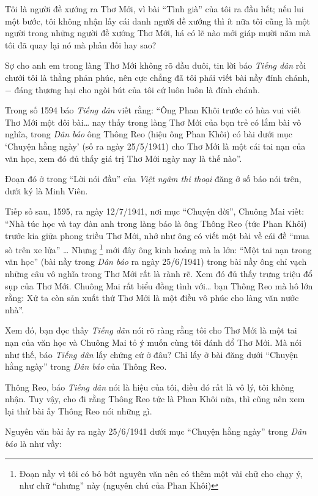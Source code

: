 \documentclass[../main.tex]{subfiles}
\begin{document}
\begin{multicols}{2}
Tôi là người đề xướng ra Thơ Mới, vì bài “Tình già” của tôi ra đầu hết; nếu lui một bước, tôi không nhận lấy cái danh người đề xướng thì ít nữa tôi cũng là một người trong những người đề xướng Thơ Mới, há có lẽ nào mới giáp mười năm mà tôi đã quay lại nó mà phản đối hay sao? 
 
Sợ cho anh em trong làng Thơ Mới không rõ đầu đuôi, tin lời báo \textit{Tiếng dân} rồi chưởi tôi là thằng phản phúc, nên cực chẳng đã tôi phải viết bài nầy đính chánh, − đáng thương hại cho ngòi bút của tôi cứ luôn luôn là đính chánh. 
 
Trong số 1594 báo \textit{Tiếng dân} viết rằng: “Ông Phan Khôi trước có hùa vui viết Thơ Mới một đôi bài… nay thấy trong làng Thơ Mới của bọn trẻ có lắm bài vô nghĩa, trong \textit{Dân báo }ông Thông Reo (hiệu ông Phan Khôi) có bài dưới mục ‘Chuyện hằng ngày’ (số ra ngày 25/5/1941) cho Thơ Mới là một cái tai nạn của văn học, xem đó đủ thấy giá trị Thơ Mới ngày nay là thế nào”. 
 
Đoạn đó ở trong “Lời nói đầu” của \textit{Việt ngâm thi thoại} đăng ở số báo nói trên, dưới ký là Minh Viên.  
 
Tiếp số sau, 1595, ra ngày 12/7/1941, nơi mục “Chuyện đời”, Chuông Mai viết: “Nhà túc học và tay đàn anh trong làng báo là ông Thông Reo (tức Phan Khôi) trước kia giữa phong triều Thơ Mới, nhớ như ông có viết một bài về cái đề “mua sò trên xe lửa” … Nhưng \footnote{
Đoạn nầy vì tôi có bỏ bớt nguyên văn nên có thêm một vài chữ cho chạy ý, như chữ “nhưng” này (nguyên chú của Phan Khôi)}  mới đây ông kinh hoảng mà la lớn: “Một tai nạn trong văn học” (bài nầy trong \textit{Dân báo} ra ngày 25/6/1941) trong bài nầy ông chỉ vạch những câu vô nghĩa trong Thơ Mới rất là rành rẽ. Xem đó đủ thấy trưng triệu đổ sụp của Thơ Mới. Chuông Mai rất biểu đồng tình với… bạn Thông Reo mà hô lớn rằng: Xứ ta còn sản xuất thứ Thơ Mới là một điều vô phúc cho làng văn nước nhà”. 
 
Xem đó, bạn đọc thấy \textit{Tiếng dân} nói rõ ràng rằng tôi cho Thơ Mới là một tai nạn của văn học và Chuông Mai tỏ ý muốn cùng tôi đánh đổ Thơ Mới. Mà nói như thế, báo \textit{Tiếng dân} lấy chứng cứ ở đâu? Chỉ lấy ở bài đăng dưới “Chuyện hằng ngày” trong \textit{Dân báo} của Thông Reo. 
 
Thông Reo, báo \textit{Tiếng dân} nói là hiệu của tôi, điều đó rất là vô lý, tôi không nhận. Tuy vậy, cho đi rằng Thông Reo tức là Phan Khôi nữa, thì cũng nên xem lại thử bài ấy Thông Reo nói những gì. 
 
Nguyên văn bài ấy ra ngày 25/6/1941 dưới mục “Chuyện hằng ngày” trong \textit{Dân báo} là như vầy: 
\begin{blockquote}
 

\end{blockquote}
\end{multicols}
\end{document}
